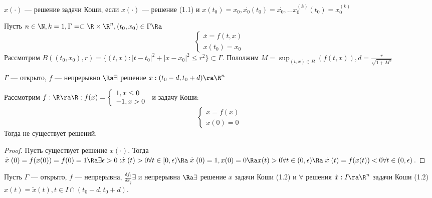 \begin{note}
    \(x(\cdot)\) --- решение задачи Коши, если \(x(\cdot)\) --- решение (1.1) и \(x(t_0) = x_0,  \stackrel{.}{x_0}(t_0) = \stackrel{.}{x_0}, \dots x_0^{(k)}(t_0) = x_0^{(k)}\)
\end{note}

\begin{theorem}
    Пусть \(n \in \N, k = 1, \Gamma = \subset \R \times \R^n, (t_0, x_0) \in \Gamma \Ra \)
    \begin{equation}
        \begin{cases}
            \stackrel{.}{x} = f(t, x) \\
            x(t_0) = x_0    
        \end{cases}
    \end{equation}
    Рассмотрим \(B((t_0, x_0), r) = \{(t, x) : |t - t_0|^2 + |x - x_0|^2 \le r^2\} \subset \Gamma\). Пололжим \(M = \sup_{(t, x) \in B}(f(t, x)), d = \frac{r}{\sqrt{1 + M^2}}\)

    \(\Gamma\) --- открыто, \(f\) --- непрерывно \(\Ra \exists \) решение \(x: (t_0 - d, t_0 + d) \ra \R^n\)
\end{theorem}

\begin{example}
    Рассмотрим \(f: \R \ra \R: f(x) = \left\{\begin{array}{l}
        1, x \le 0 \\
        -1, x > 0
    \end{array}\right.\) и задачу Коши:
    \[\left\{\begin{array}{l}
        \stackrel{.}{x} = f(x) \\
        x(0) = 0
    \end{array}\right.\]
    Тогда не существует решений.
\end{example}
\begin{proof}
    Пусть существует решение \(x(\cdot)\). Тогда \(\stackrel{.}{x}(0) = f(x(0)) = f(0) = 1 \Ra \exists \epsilon > 0: \stackrel{.}{x}(t) > 0 \forall t \in [0, \epsilon) \Ra \stackrel{.}{x}(0) = 1, x(0) = 0 \Ra x(t) > 0 \forall t \in (0, \epsilon) \Ra \stackrel{.}{x}(t) = f(x(t)) < 0 \forall t \in (0, \epsilon)\).
\end{proof}

\begin{theorem}
    Пусть \(\Gamma\) --- открыто, \(f\) --- непрерывна, \(\frac{\delta f_i}{\delta x_j} \exists\) и непрерывна \(\Ra \exists \) решение \(x\) задачи Коши (1.2) и \(\forall\) решения \(\tilde{x}: I \ra \R^n\) задачи Коши (1.2) \(x(t) = \tilde{x}(t), t \in I \cap (t_0 - d, t_0 + d)\).
\end{theorem}

